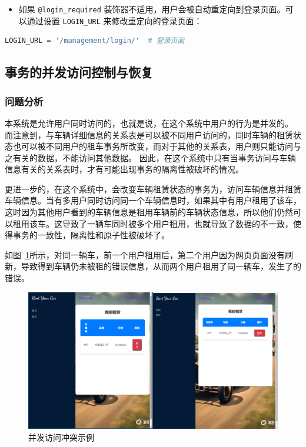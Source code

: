 \documentclass[UTF8,a4paper,12pt]{ctexart}
\begin{document}
\begin{itemize}
    \item 如果 \texttt{@login\_required} 装饰器不适用，用户会被自动重定向到登录页面。可以通过设置 \texttt{LOGIN\_URL} 来修改重定向的登录页面：
\end{itemize}

\begin{lstlisting}[language=Python]
LOGIN_URL = '/management/login/'  # 登录页面
\end{lstlisting}

\subsection{事务的并发访问控制与恢复}
\label{sec:recur}
\subsubsection{问题分析}
本系统是允许用户同时访问的，也就是说，在这个系统中用户的行为是并发的。
而注意到，与车辆详细信息的关系表是可以被不同用户访问的，同时车辆的租赁状态也可以被不同用户的租车事务所改变，而对于其他的关系表，用户则只能访问与之有关的数据，不能访问其他数据。
因此，在这个系统中只有当事务访问与车辆信息有关的关系表时，才有可能出现事务的隔离性被破坏的情况。

更进一步的，在这个系统中，会改变车辆租赁状态的事务为，访问车辆信息并租赁车辆信息。当有多用户同时访问同一个车辆信息时，如果其中有用户租用了该车，这时因为其他用户看到的车辆信息是租用车辆前的车辆状态信息，所以他们仍然可以租用该车。这导致了一辆车同时被多个用户租用，也就导致了数据的不一致，使得事务的一致性，隔离性和原子性被破坏了。

如图~\ref{fig:exam}所示，对同一辆车，前一个用户租用后，第二个用户因为网页页面没有刷新，导致得到车辆仍未被租的错误信息，从而两个用户租用了同一辆车，发生了的错误。
\begin{figure}[htbp]  %
    \centering  %
    \includegraphics[width=1\textwidth]{pic/exam.png}
    \caption{并发访问冲突示例}  %
    \label{fig:exam}  %
\end{figure}
\end{document}
